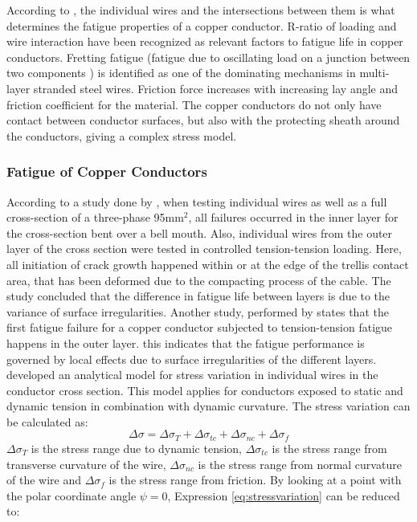 \noindent According to \cite{Karlsen2010}, the individual wires and the intersections between them is what determines the fatigue properties of a copper conductor. R-ratio of loading and wire interaction have been recognized as relevant factors to fatigue life in copper conductors. Fretting fatigue (fatigue due to oscillating load on a junction between two components \cite{Hills1994}) is identified as one of the dominating mechanisms in multi-layer stranded steel wires. Friction force increases with increasing lay angle and friction coefficient for the material. The copper conductors do not only have contact between conductor surfaces, but also with the protecting sheath around the conductors, giving a complex stress model.

\subsubsection{Fatigue of Copper Conductors}
\label{sec:fatcop}
According to a study done by \cite{Nasution2013}, when testing individual wires as well as a full cross-section of a three-phase 95mm$^2$, all failures occurred in the inner layer for the cross-section bent over a bell mouth. Also, individual wires from the outer layer of the cross section were tested in controlled tension-tension loading. Here, all initiation of crack growth happened within or at the edge of the trellis contact area, that has been deformed due to the compacting process of the cable. The study concluded that the difference in fatigue life between layers is due to the variance of surface irregularities. Another study, performed by \cite{NASUTION2014} states that the first fatigue failure for a copper conductor subjected to tension-tension fatigue happens in the outer layer. this indicates that the fatigue performance is governed by local effects due to surface irregularities of the different layers. \newline
\newline
\noindent \cite{s300} developed an analytical model for stress variation in individual wires in the conductor cross section. This model applies for conductors exposed to static and dynamic tension in combination with dynamic curvature. The stress variation can be calculated as:   
\begin{equation}
    \Delta \sigma = \Delta \sigma_T + \Delta \sigma_{tc} + \Delta \sigma_{nc} + \Delta \sigma_{f}
    \label{eq:stressvariation}
\end{equation}
\noindentWhere $\Delta \sigma_T$ is the stress range due to dynamic tension, $\Delta \sigma_{tc}$ is the stress range from transverse curvature of the wire, $\Delta \sigma_{nc}$ is the stress range from normal curvature of the wire and $\Delta \sigma_{f}$ is the stress range from friction. By looking at a point with the polar coordinate angle $\psi = 0$, Expression \ref{eq:stressvariation} can be reduced to:
